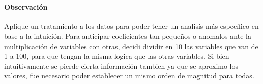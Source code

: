 \documentclass[11pt]{article}
\begin{document}
    \begin{center}
    \end{center}
    { \hspace*{\fill} \\}
    
    \paragraph{Observación}\label{observaciuxf3n}

Aplique un tratamiento a los datos para poder tener un analisís más
específico en base a la intuición. Para anticipar coeficientes tan
pequeños o anomalos ante la multiplicación de variables con otras,
decidi dividir en 10 las variables que van de 1 a 100, para que tengan
la misma logica que las otras variables. Si bien intuitivamente se
pierde cierta información tambien ya que se aproximo los valores, fue
necesario poder establecer un mismo orden de magnitud para todas.
\end{document}
